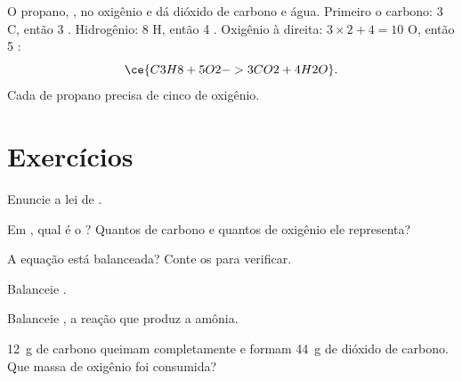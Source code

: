 \begin{example}\label{ex:g8:balanced-equations:propane}
O propano, ,  no oxigênio e dá dióxido de carbono e água.
Primeiro o carbono: 3 C, então 3 . Hidrogênio: 8 H, então 4
. Oxigênio à direita: $3 \times 2 + 4 = 10$ O, então 5 :
\[
  \ce{C3H8 + 5O2 -> 3CO2 + 4H2O}.
\]
Cada  de propano precisa de cinco  de oxigênio.
\end{example}

\section{Exercícios}

\begin{exercise}[$\star$]\label{exo:g8:balanced-equations:1}
Enuncie a lei de .
\end{exercise}

\begin{exercise}[$\star$]\label{exo:g8:balanced-equations:2}
Em , qual é o ? Quantos  de
carbono e quantos  de oxigênio ele representa?
\end{exercise}

\begin{exercise}[$\star$]\label{exo:g8:balanced-equations:3}
A equação  está balanceada? Conte os  para
verificar.
\end{exercise}

\begin{exercise}[$\star$]\label{exo:g8:balanced-equations:4}
Balanceie . %
\end{exercise}

\begin{exercise}[$\star\star$]\label{exo:g8:balanced-equations:5}
Balanceie , a reação que produz a amônia. %
\end{exercise}

\begin{exercise}[$\star\star$]\label{exo:g8:balanced-equations:6}
\qty{12}{g} de carbono queimam completamente e formam \qty{44}{g} de
dióxido de carbono. Que massa de oxigênio foi consumida?
\end{exercise}

